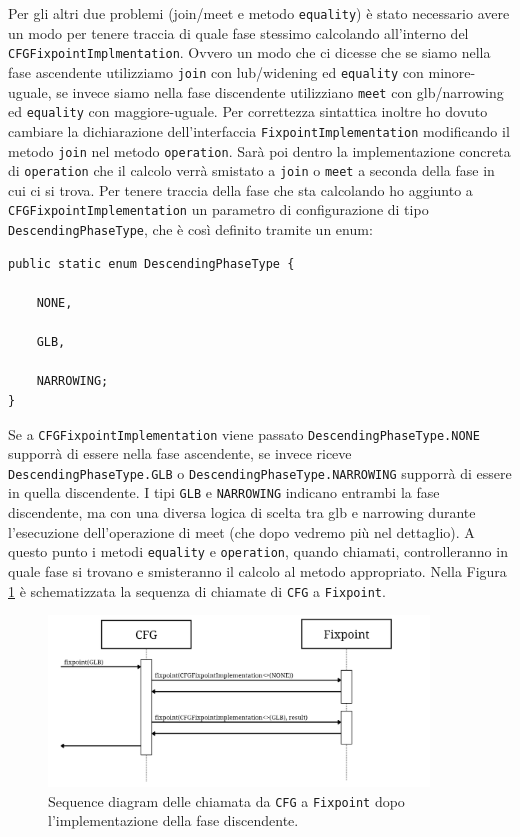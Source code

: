 Per gli altri due problemi (join/meet e metodo \texttt{equality}) è stato necessario avere un modo per tenere traccia di quale fase stessimo calcolando all'interno del \texttt{CFGFixpointImplmentation}. Ovvero un modo che ci dicesse che se siamo nella fase ascendente utilizziamo \texttt{join} con lub/widening ed \texttt{equality} con minore-uguale, se invece siamo nella fase discendente utilizziano \texttt{meet} con glb/narrowing ed \texttt{equality} con maggiore-uguale. Per correttezza sintattica inoltre ho dovuto cambiare la dichiarazione dell'interfaccia \texttt{FixpointImplementation} modificando il metodo \texttt{join} nel metodo \texttt{operation}. Sarà poi dentro la implementazione concreta di \texttt{operation} che il calcolo verrà smistato a \texttt{join} o \texttt{meet} a seconda della fase in cui ci si trova. Per tenere traccia della fase che sta calcolando ho aggiunto a \texttt{CFGFixpointImplementation} un parametro di configurazione di tipo \texttt{DescendingPhaseType}, che è così definito tramite un enum:  
\begin{lstlisting}[belowskip=-1.1 \baselineskip, escapechar=|]
public static enum DescendingPhaseType {

    NONE,
    
    GLB,
    
    NARROWING;
}
\end{lstlisting}
Se a \texttt{CFGFixpointImplementation} viene passato \texttt{DescendingPhaseType.NONE} supporrà di essere nella fase ascendente, se invece riceve \texttt{DescendingPhaseType.GLB} o \texttt{DescendingPhaseType.NARROWING} supporrà di essere in quella discendente. I tipi \texttt{GLB} e \texttt{NARROWING} indicano entrambi la fase discendente, ma con una diversa logica di scelta tra glb e narrowing durante l'esecuzione dell'operazione di meet (che dopo vedremo più nel dettaglio). A questo punto i metodi \texttt{equality} e \texttt{operation}, quando chiamati, controlleranno in quale fase si trovano e smisteranno il calcolo al metodo appropriato. Nella Figura \ref{fig:flowFaseDisc} è schematizzata la sequenza di chiamate di \texttt{CFG} a \texttt{Fixpoint}.

\begin{figure}
	\centering
	\includegraphics[width=0.9\textwidth]{Immagini/flowFaseDisc.png}
	\caption{Sequence diagram delle chiamata da \texttt{CFG} a \texttt{Fixpoint} dopo l'implementazione della fase discendente.}
	\label{fig:flowFaseDisc}
\end{figure}

